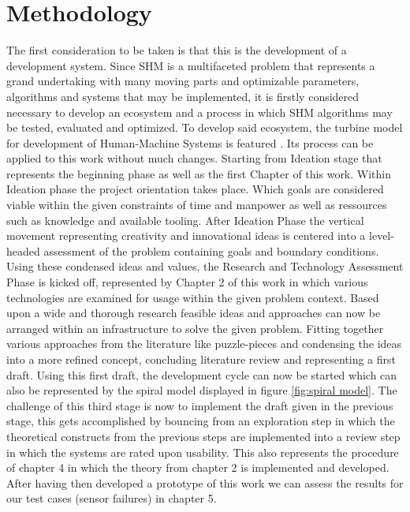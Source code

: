 \section{Methodology}

The first consideration to be taken is that this is the development of a development system. Since SHM is a multifaceted problem that represents a grand undertaking with many moving parts and optimizable parameters, algorithms and systems that may be implemented, it is firstly considered necessary to develop an ecosystem and a process in which SHM algorithms may be tested, evaluated and optimized. To develop said ecosystem, the turbine model for development of Human-Machine Systems is featured \cite{adlakha-hutcheon_human_2022}. Its process can be applied to this work without much changes. Starting from Ideation stage that represents the beginning phase as well as the first Chapter of this work. Within Ideation phase the project orientation takes place. Which goals are considered viable within the given constraints of time and manpower as well as ressources such as knowledge and available tooling.
After Ideation Phase the vertical movement representing creativity and innovational ideas is centered into a level-headed assessment of the problem containing goals and boundary conditions. Using these condensed ideas and values, the Research and Technology Assessment Phase is kicked off, represented by Chapter 2 of this work in which various technologies are examined for usage within the given problem context. Based upon a wide and thorough research feasible ideas and approaches can now be arranged within an infrastructure to solve the given problem. Fitting together various approaches from the literature like puzzle-pieces and condensing the ideas into a more refined concept, concluding literature review and representing a first draft. Using this first draft, the development cycle can now be started which can also be represented by the spiral model displayed in figure \ref{fig:spiral model}. The challenge of this third stage is now to implement the draft given in the previous stage, this gets accomplished by bouncing from an exploration step in which the theoretical constructs from the previous steps are implemented into a review step in which the systems are rated upon usability. This also represents the procedure of chapter 4 in which the theory from chapter 2 is implemented and developed. After having then developed a prototype of this work we can assess the results for our test cases (sensor failures) in chapter 5.




